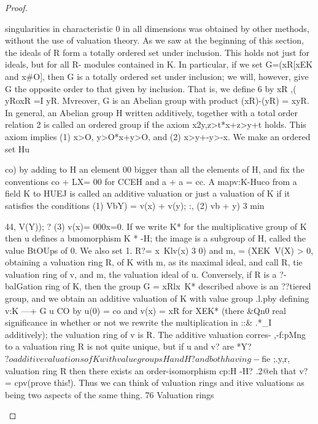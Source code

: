 \begin{proof}
\begin{mathematicalrecord}
  singularities in characteristic 0 in all dimensions was obtained by other
  methods, without the use of valuation theory.
     As we saw at the beginning of this section, the ideals of R form a totally
  ordered set under inclusion. This holds not just for ideals, but for all R-
  modules contained in K. In particular, if we set
             G=(xR[xEK       and x#O],
  then G is a totally ordered set under inclusion; we will, however, give G the
  opposite order to that given by inclusion. That is, we define 6 by
           xR ,( yRoxR       =I yR.
  Mvreover, G is an Abelian group with product (xR)-(yR) = xyR. In general,
  an Abelian group H written additively, together with a total order relation
  2 is called an ordered group if the axiom
           x2y,z>t*x+z>y+t
  holds. This axiom implies
           (1) x>O,     y>O*x+y>O,          and (2) x>y+-y>-x.
  We make an ordered set Hu {co) by adding to H an element 00 bigger
  than all the elements of H, and fix the conventions co + LX= 00 for CCEH
  and a + a = cc. A mapv:K-Hu{co}               from a field K to HU{EJ}
  is called an additive valuation or just a valuation of K if it satisfies the
  conditions
      (1) VbY) = v(x) + v(y);
   :, (2) vb + y) 3 min { 44, V(Y));
    ? (3) v(x)= 000x=0.
  If we write K* for the multiplicative       group of K then u defines a
  bmomorphism       K * -H;    the image is a subgroup of H, called the value
  BtOUps of 0. We also set
   1.
               R?= {x~Klv(x) 3 0) and m, = (XEK~V(X) > 0},
     obtaining a valuation ring R, of K with m, as its maximal ideal, and call R,
     tie valuation ring of v, and m, the valuation ideal of u. Conversely, if R is a
   ?-balGation ring of K, then the group G = {xRlx~K*} described above is an
 ??tiered group, and we obtain an additive valuation of K with value group
  .l.pby defining v:K ---+ G u {CO} by u(0) = co and v(x) = xR for XEK* (there
   &Qn0 real significance in whether or not we rewrite the multiplication         in
::&
.*_I additively); the valuation ring of v is R. The additive valuation corres-
,-f:pMng        to a valuation ring R is not quite unique, but if u and v? are
*Y?$?oadditive valuations of K with value groups H and H? and both having
-$fie
 ;.y,r, valuation ring R then there exists an order-isomorphism        cp:H -H?
 .2@eh that v? = cpv(prove this!). Thus we can think of valuation rings and
         itive valuations as being two aspects of the same thing.
76       Valuation rings

}}
\end{mathematicalrecord}
\end{proof}
